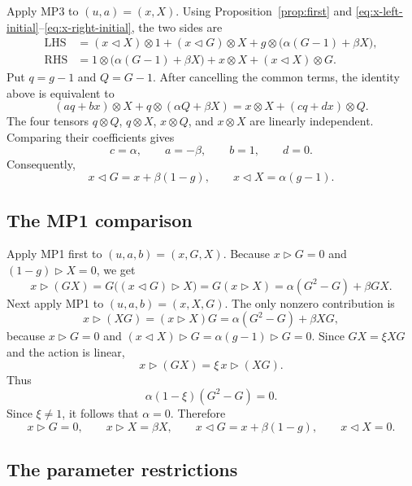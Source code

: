 \documentclass[twoside,11pt]{amsart}
\begin{document}
	Apply MP3 to $(u,a)=(x,X)$. Using Proposition~\ref{prop:first} and
	\eqref{eq:x-left-initial}--\eqref{eq:x-right-initial}, the two sides are
	\[
	\begin{aligned}
		\mathrm{LHS}
		&=(x\triangleleft X)\otimes1
		+(x\triangleleft G)\otimes X
		+g\otimes\bigl(\alpha(G-1)+\beta X\bigr),\\
		\mathrm{RHS}
		&=1\otimes\bigl(\alpha(G-1)+\beta X\bigr)
		+x\otimes X+(x\triangleleft X)\otimes G.
	\end{aligned}
	\]
	Put $q=g-1$ and $Q=G-1$. After cancelling the common terms, the identity
	above is equivalent to
	\[
	(aq+bx)\otimes X+q\otimes(\alpha Q+\beta X)
	=x\otimes X+(cq+dx)\otimes Q.
	\]
	The four tensors
	$q\otimes Q$, $q\otimes X$, $x\otimes Q$, and $x\otimes X$ are linearly
	independent. Comparing their coefficients gives
	\[
	c=\alpha,
	\qquad a=-\beta,
	\qquad b=1,
	\qquad d=0.
	\]
	Consequently,
	\begin{equation}\label{eq:x-right-mid}
		x\triangleleft G=x+\beta(1-g),
		\qquad
		x\triangleleft X=\alpha(g-1).
	\end{equation}
	
	\subsection{The MP1 comparison}
	
	Apply MP1 first to $(u,a,b)=(x,G,X)$. Because
	$x\triangleright G=0$ and $(1-g)\triangleright X=0$, we get
	\[
	x\triangleright(GX)
	=G\bigl((x\triangleleft G)\triangleright X\bigr)
	=G(x\triangleright X)
	=\alpha(G^2-G)+\beta GX.
	\]
	Next apply MP1 to $(u,a,b)=(x,X,G)$. The only nonzero contribution is
	\[
	x\triangleright(XG)
	=(x\triangleright X)G
	=\alpha(G^2-G)+\beta XG,
	\]
	because $x\triangleright G=0$ and
	$(x\triangleleft X)\triangleright G=\alpha(g-1)\triangleright G=0$.
	Since $GX=\xi XG$ and the action is linear,
	\[
	x\triangleright(GX)=\xi\,x\triangleright(XG).
	\]
	Thus
	\[
	\alpha(1-\xi)(G^2-G)=0.
	\]
	Since $\xi\ne1$, it follows that $\alpha=0$. Therefore
	\begin{equation}\label{eq:x-actions-generators}
		x\triangleright G=0,
		\qquad x\triangleright X=\beta X,
		\qquad x\triangleleft G=x+\beta(1-g),
		\qquad x\triangleleft X=0.
	\end{equation}
	
	\subsection{The parameter restrictions}
	
\end{document}
